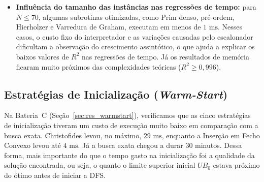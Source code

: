 \begin{itemize}
    \item \textbf{Influência do tamanho das instâncias nas regressões de tempo:} para $N \le 70$, algumas subrotinas otimizadas, como Prim denso, pré-ordem, Hierholzer e Varredura de Graham, executam em menos de $1\text{ ms}$. Nesses casos, o custo fixo do interpretador e as variações causadas pelo escalonador dificultam a observação do crescimento assintótico, o que ajuda a explicar os baixos valores de $R^2$ nas regressões de tempo. Já os resultados de memória ficaram muito próximos das complexidades teóricas ($R^2 \ge 0{,}996$).
\end{itemize}

\subsection{Estratégias de Inicialização (\textit{Warm-Start})}
\label{sec:conc_warmstarts}

Na Bateria~C (Seção~\ref{sec:res_warmstart}), verificamos que as cinco estratégias de inicialização tiveram um custo de execução muito baixo em comparação com a busca exata. Christofides levou, no máximo, $29\text{ ms}$, enquanto a Inserção em Fecho Convexo levou até $4\text{ ms}$. Já a busca exata chegou a durar 30 minutos. Dessa forma, mais importante do que o tempo gasto na inicialização foi a qualidade da solução encontrada, ou seja, o quanto o limite superior inicial $UB_0$ estava próximo do ótimo antes de iniciar a DFS.

